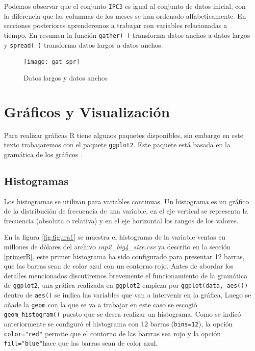 \documentclass[letterpaper,]{book}
\begin{document}
Podemos observar que el conjunto \texttt{IPC3} es igual al conjunto de datos inicial, con la diferencia que las columnas de los meses se han ordenado alfabeticamente. En secciones posteriores aprenderemos a trabajar con variables relacionadas a tiempo. En resumen la función \texttt{gather(\ )} transforma datos anchos a datos largos y \texttt{spread(\ )} transforma datos largos a datos anchos.

\begin{figure}[!h]

{\centering \texttt{[image: gat\_spr]} 

}

\caption{Datos largos y datos anchos}\label{fig:gatspr}
\end{figure}

\newpage

\hypertarget{graficos-y-visualizacion}{%
\section{Gráficos y Visualización}\label{graficos-y-visualizacion}}

Para realizar gráficas R tiene algunos paquetes disponibles, sin embargo en este texto trabajaremos con el paquete \texttt{ggplot2}. Este paquete está basada en la gramática de los gráficos \citep{wilkinson2005}.

\hypertarget{histogramas}{%
\subsection{Histogramas}\label{histogramas}}

Los histogramas se utilizan para variables continuas. Un histograma es un gráfico de la distribución de frecuencia de una variable, en el eje vertical se representa la frecuencia (absoluta o relativa) y en el eje horizontal los rangos de los valores.

En la figura \ref{fig:figura1} se muestra el histograma de la variable ventas en millones de dólares del archivo \emph{cap2\_big4\_size.csv} ya descrito en la sección \ref{primerR}, este primer histograma ha sido configurado para presentar 12 barras, que las barras sean de color azul con un contorno rojo. Antes de abordar los detalles mencionados discutiremos brevemente el funcionamiento de la gramática de \texttt{ggplot2}, una gráfica realizada en \texttt{ggplot2} empieza por \texttt{ggplot(data,\ aes())} dentro de \texttt{aes()} se indica las variables que van a intervenir en la gráfica, Luego se añade la \texttt{geom} con la que se va a trabajar en este caso se escogió \texttt{geom\_histogram()} puesto que se desea realizar un histograma. Como se indicó anteriormente se configuró el histograma con 12 barras (\texttt{bins=12}), la opción \texttt{color="red"} permite que el contorno de las barrras sea rojo y la opción \texttt{fill="blue"}hace que las barras sean de color azul.
\end{document}
